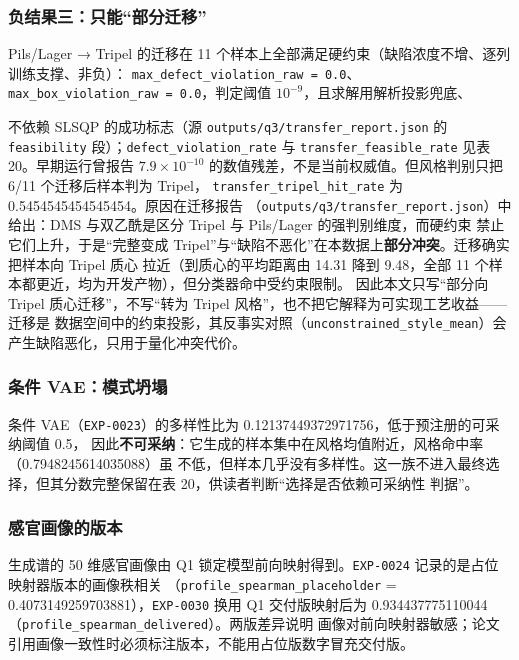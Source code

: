 \documentclass[
  a4paper,12pt]{article}
\begin{document}
\subsubsection{负结果三：只能``部分迁移''}\label{ux8d1fux7ed3ux679cux4e09ux53eaux80fdux90e8ux5206ux8fc1ux79fb}

Pils/Lager → Tripel 的迁移在 11
个样本上全部满足硬约束（缺陷浓度不增、逐列训练支撑、非负）：
\texttt{max\_defect\_violation\_raw\ =\ 0.0}、\texttt{max\_box\_violation\_raw\ =\ 0.0}，判定阈值
\(10^{-9}\)，且求解用解析投影兜底、

不依赖 SLSQP 的成功标志（源 \texttt{outputs/q3/transfer\_report.json} 的
\texttt{feasibility} 段）；\texttt{defect\_violation\_rate} 与
\texttt{transfer\_feasible\_rate} 见表 20。早期运行曾报告
\(7.9\times10^{-10}\) 的数值残差，不是当前权威值。但风格判别只把 6/11
个迁移后样本判为 Tripel， \texttt{transfer\_tripel\_hit\_rate} 为
0.5454545454545454。原因在迁移报告
（\texttt{outputs/q3/transfer\_report.json}）中给出：DMS 与双乙酰是区分
Tripel 与 Pils/Lager 的强判别维度，而硬约束 禁止它们上升，于是``完整变成
Tripel''与``缺陷不恶化''在本数据上\textbf{部分冲突}。迁移确实把样本向
Tripel 质心 拉近（到质心的平均距离由 14.31 降到 9.48，全部 11
个样本都更近，均为开发产物），但分类器命中受约束限制。
因此本文只写``部分向 Tripel 质心迁移''，不写``转为 Tripel
风格''，也不把它解释为可实现工艺收益------迁移是
数据空间中的约束投影，其反事实对照（\texttt{unconstrained\_style\_mean}）会产生缺陷恶化，只用于量化冲突代价。

\subsubsection{条件
VAE：模式坍塌}\label{ux6761ux4ef6-vaeux6a21ux5f0fux574dux584c}

条件 VAE（\texttt{EXP-0023}）的多样性比为
0.12137449372971756，低于预注册的可采纳阈值 0.5，
因此\textbf{不可采纳}：它生成的样本集中在风格均值附近，风格命中率（0.7948245614035088）虽
不低，但样本几乎没有多样性。这一族不进入最终选择，但其分数完整保留在表
20，供读者判断``选择是否依赖可采纳性 判据''。

\subsubsection{感官画像的版本}\label{ux611fux5b98ux753bux50cfux7684ux7248ux672c}

生成谱的 50 维感官画像由 Q1 锁定模型前向映射得到。\texttt{EXP-0024}
记录的是占位映射器版本的画像秩相关
（\texttt{profile\_spearman\_placeholder} =
0.4073149259703881），\texttt{EXP-0030} 换用 Q1 交付版映射后为
0.934437775110044（\texttt{profile\_spearman\_delivered}）。两版差异说明
画像对前向映射器敏感；论文引用画像一致性时必须标注版本，不能用占位版数字冒充交付版。
\end{document}
